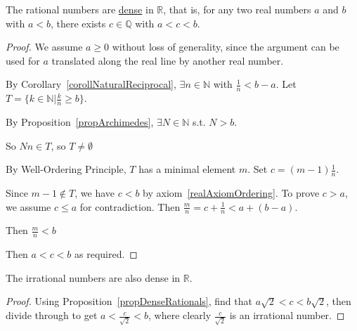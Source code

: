 \documentclass[../Main.tex]{subfiles}
\begin{document}
\begin{proposition}
    The rational numbers are \underline{dense} in $\mathbb{R}$, that is, for any two real numbers $a$ and $b$ with $a<b$, there exists $c \in \mathbb{Q}$ with $a<c<b$.
    \label{propDenseRationals}
\end{proposition}
\begin{proof}
    We assume $a\geq 0$ without loss of generality, since the argument can be used for $a$ translated along the real line by another real number.\par
    By Corollary~\ref{corollNaturalReciprocal}, $\exists n \in \mathbb{N}$ with $\frac{1}{n} < b - a$. Let $T = \{k \in \mathbb{N} | \frac{k}{n} \geq b\}$.\par
    By Proposition~\ref{propArchimedes}, $\exists N \in \mathbb{N}$ s.t. $N > b$.\par
    So $Nn \in T$, so $T \neq \emptyset$\par
    By Well-Ordering Principle, $T$ has a minimal element $m$. Set $c=(m-1)\frac{1}{n}$.\par
    Since $m-1 \notin T$, we have $c < b$ by axiom~\ref{realAxiomOrdering}.
    To prove $c > a$, we assume $c \leq a$ for contradiction. Then $\frac{m}{n}=c + \frac{1}{n} < a + (b-a)$.\par
    Then $\frac{m}{n} < b$ \contradiction\par
    Then $a<c<b$ as required.
\end{proof}
\begin{proposition}
    The irrational numbers are also dense in $\mathbb{R}$.
    \label{propDenseIrrationals}
\end{proposition}
\begin{proof}
    Using Proposition~\ref{propDenseRationals}, find that $a\sqrt{2} < c < b\sqrt{2}$, then divide through to get $a < \frac{c}{\sqrt{2}} < b$, where clearly $\frac{c}{\sqrt{2}}$ is an irrational number.
\end{proof}
\end{document}
